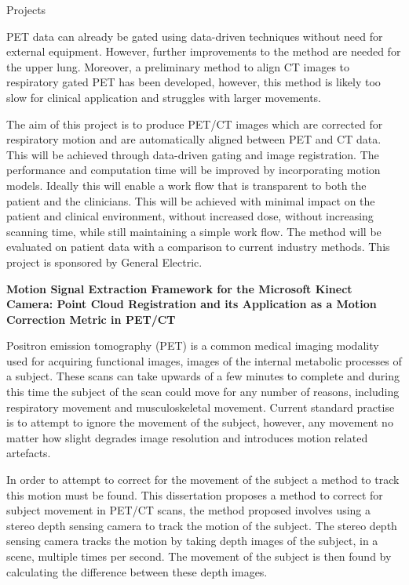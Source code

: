 \documentclass{cv}
\begin{document}
\begin{rSection}{Projects}
\item PET data can already be gated using data-driven techniques without need for external equipment. However, further improvements to the method are needed for the upper lung. Moreover, a preliminary method to align CT images to respiratory gated PET has been developed, however, this method is likely too slow for clinical application and struggles with larger movements.

\item The aim of this project is to produce PET/CT images which are corrected for respiratory motion and are automatically aligned between PET and CT data. This will be achieved through data-driven gating and image registration. The performance and computation time will be improved by incorporating motion models. Ideally this will enable a work flow that is transparent to both the patient and the clinicians. This will be achieved with minimal impact on the patient and clinical environment, without increased dose, without increasing scanning time, while still maintaining a simple work flow. The method will be evaluated on patient data with a comparison to current industry methods. This project is sponsored by General Electric.


{\bf Motion Signal Extraction Framework for the Microsoft Kinect Camera: Point Cloud Registration and its Application as a Motion Correction Metric in PET/CT} \hfill {\em} 

\item Positron emission tomography (PET) is a common medical imaging modality used for acquiring functional images, images of the internal metabolic processes of a subject. These scans can take upwards of a few minutes to complete and during this time the subject of the scan could move for any number of reasons, including respiratory movement and musculoskeletal movement. Current standard practise is to attempt to ignore the movement of the subject, however, any movement no matter how slight degrades image resolution and introduces motion related artefacts.

\item In order to attempt to correct for the movement of the subject a method to track this motion must be found. This dissertation proposes a method to correct for subject movement in PET/CT scans, the method proposed involves using a stereo depth sensing camera to track the motion of the subject. The stereo depth sensing camera tracks the motion by taking depth images of the subject, in a scene, multiple times per second. The movement of the subject is then found by calculating the difference between these depth images.


\end{rSection}
\end{document}
